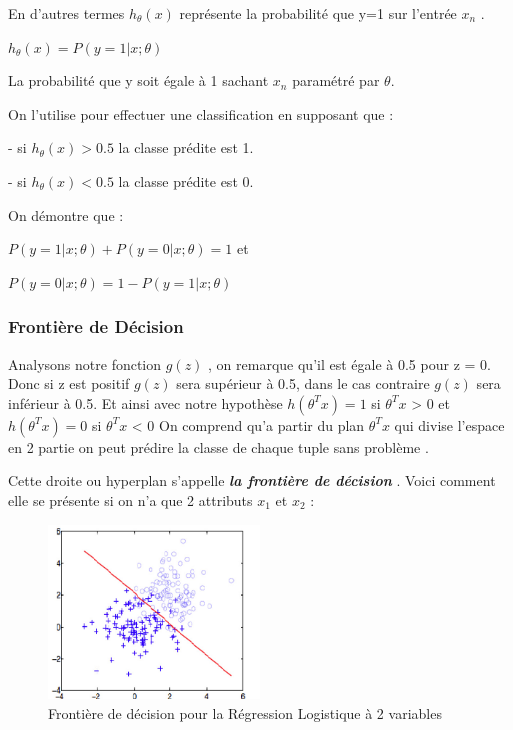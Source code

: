 En d'autres termes ${h}_{\theta}\left(x\right)$ représente la probabilité que y=1 sur l'entrée  ${x}_{n}$ .
\begin{center}
	${h}_{\theta}\left(x\right)=P(y=1|x;\theta)$
\end{center}
La probabilité que y soit égale à 1 sachant ${x}_{n}$ paramétré par $\theta$.

On l'utilise pour effectuer une classification en supposant que :

- si ${h}_{\theta}\left(x\right)> 0.5 $ la classe prédite est 1.

- si ${h}_{\theta}\left(x\right)< 0.5 $ la classe prédite est 0.

On démontre que :
\begin{center}
	$P(y=1|x;\theta) + P(y=0|x;\theta) = 1 $ et
	
	$P(y=0|x;\theta) = 1-  P(y=1|x;\theta)$
\end{center}
\subsubsection{Frontière de Décision }
Analysons notre fonction $g(z)$ , on remarque qu'il est égale à 0.5 pour z = 0.
Donc si z est positif $g(z)$ sera supérieur à 0.5, dans le cas contraire $g(z)$ sera inférieur à 0.5.
Et ainsi avec notre hypothèse
$h({\theta }^{T}{x}) = 1 $ si  ${\theta }^{T}{x}$ > 0 et 
$h({\theta }^{T}{x}) = 0 $ si  ${\theta }^{T}{x}$ < 0
On comprend qu'a partir du plan  ${\theta }^{T}{x}$ qui divise l'espace en 2 partie on peut prédire la classe de chaque tuple  sans problème .

Cette droite ou hyperplan  s'appelle \emph{\textbf{la frontière de décision }}.
Voici comment elle se présente si on n'a que 2 attributs ${x}_{1}$ et ${x}_{2}$ :
\begin{figure}[ht]
	\centering
	\includegraphics[width=0.5\textwidth]{fig/DecisionBoudary.png}
	\caption{Frontière de décision pour la Régression Logistique à 2 variables}
	\label{fig:image5}
\end{figure}

